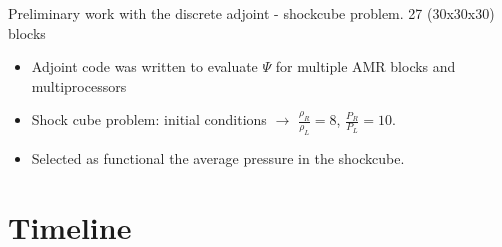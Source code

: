 \documentclass{beamer}
\begin{document}
\begin{frame}
\begin{minipage}[t][1\textheight]{1\textwidth}
\begin{exampleblock}{Preliminary work with the discrete adjoint - shockcube problem. 27 (30x30x30) blocks}
\begin{figure}
\end{figure}
\vspace{-10pt}
\begin{itemize}
\scriptsize

\item Adjoint code was written to evaluate $\Psi$ for multiple AMR blocks and multiprocessors
\item Shock cube problem: initial conditions $\rightarrow$ $\frac{\rho_R}{\rho_L} = 8$, $\frac{P_R}{P_L} = 10$. 
\item Selected as functional the average pressure in the shockcube.

\end{itemize}

\end{exampleblock}
\end{minipage}

\end{frame}


\section[Timeline]{Timeline}
\end{document}
